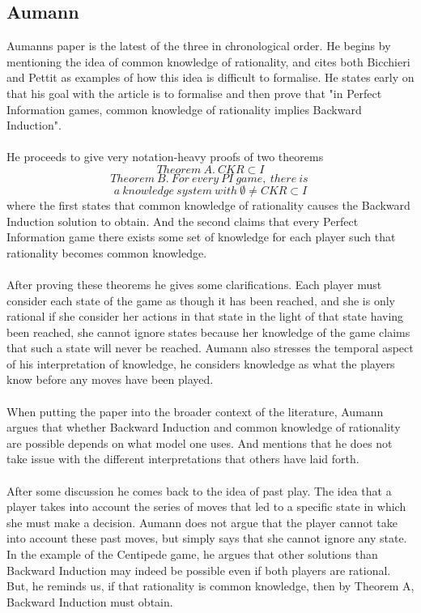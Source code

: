 \documentclass{article}
\begin{document}
\subsection{Aumann}
Aumanns paper is the latest of the three in chronological order. He begins by mentioning the idea of common knowledge of rationality, and cites both Bicchieri and Pettit as examples of how this idea is difficult to formalise. He states early on that his goal with the article is to formalise and then prove that "in Perfect Information games, common knowledge of rationality implies Backward Induction".
\\
\\
He proceeds to give very notation-heavy proofs of two theorems
$$ Theorem\ A. \ CKR \subset I $$
$$ Theorem\ B. \ For \ every \ PI\ game,\ there\ is\ $$
$$a\ knowledge\ system\ with\ \emptyset \neq CKR \subset I $$
where the first states that common knowledge of rationality causes the Backward Induction solution to obtain. And the second claims that every Perfect Information game there exists some set of knowledge for each player such that rationality becomes common knowledge.
\\
\\
After proving these theorems he gives some clarifications. Each player must consider each state of the game as though it has been reached, and she is only rational if she consider her actions in that state in the light of that state having been reached, she cannot ignore states because her knowledge of the game claims that such a state will never be reached. Aumann also stresses the temporal aspect of his interpretation of knowledge, he considers knowledge as what the players know before any moves have been played.
\\
\\
When putting the paper into the broader context of the literature, Aumann argues that whether Backward Induction and common knowledge of rationality are possible depends on what model one uses. And mentions that he does not take issue with the different interpretations that others have laid forth.
\\
\\
After some discussion he comes back to the idea of past play. The idea that a player takes into account the series of moves that led to a specific state in which she must make a decision. Aumann does not argue that the player cannot take into account these past moves, but simply says that she cannot ignore any state. In the example of the Centipede game, he argues that other solutions than Backward Induction may indeed be possible even if both players are rational. But, he reminds us, if that rationality is common knowledge, then by Theorem A, Backward Induction must obtain.
\end{document}
